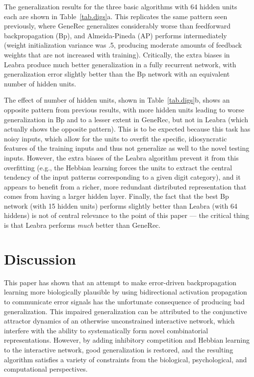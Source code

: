 \documentclass[12pt,twoside]{article}
\begin{document}
The generalization results for the three basic algorithms with 64
hidden units each are shown in Table~\ref{tab.digs}a.  This replicates
the same pattern seen previously, where GeneRec generalizes
considerably worse than feedforward backpropagation (Bp), and
Almeida-Pineda (AP) performs intermediately (weight initialization
variance was .5, producing moderate amounts of feedback weights that
are not increased with training).  Critically, the extra biases in
Leabra produce much better generalization in a fully recurrent
network, with generalization error slightly better than the Bp network
with an equivalent number of hidden units.

The effect of number of hidden units, shown in Table~\ref{tab.digs}b,
shows an opposite pattern from previous results, with more hidden
units leading to worse generalization in Bp and to a lesser extent in
GeneRec, but not in Leabra (which actually shows the opposite
pattern).  This is to be expected because this task has noisy inputs,
which allow for the units to overfit the specific, idiosyncratic
features of the training inputs and thus not generalize as well to the
novel testing inputs.  However, the extra biases of the Leabra
algorithm prevent it from this overfitting (e.g., the Hebbian learning
forces the units to extract the central tendency of the input patterns
corresponding to a given digit category), and it appears to benefit
from a richer, more redundant distributed representation that comes
from having a larger hidden layer.  Finally, the fact that the best Bp
network (with 15 hidden units) performs slightly better than Leabra
(with 64 hiddens) is not of central relevance to the point of this
paper --- the critical thing is that Leabra performs {\em much} better
than GeneRec.

\section{Discussion}

This paper has shown that an attempt to make error-driven
backpropagation learning more biologically plausible by using
bidirectional activation propagation to communicate error signals has
the unfortunate consequence of producing bad generalization.  This
impaired generalization can be attributed to the conjunctive attractor
dynamics of an otherwise unconstrained interactive network, which
interfere with the ability to systematically form novel combinatorial
representations.  However, by adding inhibitory competition and
Hebbian learning to the interactive network, good generalization is
restored, and the resulting algorithm satisfies a variety of
constraints from the biological, psychological, and computational
perspectives.
\end{document}
